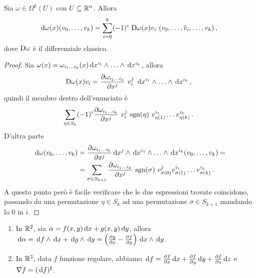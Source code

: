 \begin{corollary}
	Sia $\omega \in \Omega^k(U)$ con $U\subseteq \mathbb R^n$. Allora
	\begin{equation*}
		\,\mathrm d \omega (x) (v_0,\ldots,v_k) = \sum_{i=0}^k (-1)^i\ \mathrm D \omega (x) v_i\ (v_0,\ldots,\hat v_i, \ldots, v_k)\, \text{, }
	\end{equation*}
	dove $\mathrm D \omega$ è il differenziale classico.
\end{corollary}
\begin{proof}
	Sia $\omega(x) = \omega_{i_1 \ldots  i_{k}} (x) \,\mathrm d x^{i_1}\wedge\ldots\wedge \,\mathrm d x^{i_k}$, allora
	\begin{equation*}
		\mathrm D \omega(x) v_i = \frac{\partial \omega_{i_1 \ldots  i_{k}}}{\partial x^j}\ v_i^j\ \,\mathrm d x^{i_1}\wedge\ldots\wedge \,\mathrm d x^{i_k} \, \text{, }
	\end{equation*}
	quindi il membro destro dell'enunciato è
	\begin{equation*}
		\sum_{\eta\in S_k}(-1)^i \DerParz{\omega_{\seqb ik{}}}{x^j}\ v_i^j\ \sgn(\eta)\ v_{\eta(1)}^{i_1} \ldots v_{\eta(k)}^{i_k} \punto
	\end{equation*}
	D'altra parte
	\begin{align*}
		\,\mathrm d \omega (v_0,\ldots,v_k) &= \frac{\partial \omega_{i_1 \ldots  i_{k}}}{\partial x^j} \,\mathrm d x^j \wedge \,\mathrm d x^{i_1}\wedge\ldots\wedge \,\mathrm d x^{i_k} (v_0,\ldots,v_k)= \\ 
		&=\sum_{\sigma \in S_{k+1}}\frac{\partial \omega_{i_1 \ldots  i_{k}}}{\partial x^j}\ \mathrm{sgn}(\sigma)\ v_{\sigma(0)}^{j} v_{\sigma(1)}^{i_1} \ldots v_{\sigma(k)}^{i_k} \, \text{. }
	\end{align*}
	A questo punto però è facile verificare che le due espressioni trovate coincidono, passando da una permutazione $\eta \in S_k$ ad una permutazione $\sigma \in S_{k+1}$ mandando lo 0 in $i$.
\end{proof}

\begin{example}
	\begin{enumerate}
	 \item In $\mathbb R^2$, sia $\alpha = f(x,y) \,\mathrm d x + g(x,y) \,\mathrm d y$, allora $\,\mathrm d \alpha= \,\mathrm d f\wedge \,\mathrm d x + \,\mathrm d g \wedge \,\mathrm d y = \left(\frac{\partial g}{\partial x} - \frac{\partial f}{\partial y}\right) \,\mathrm d x\wedge \,\mathrm d y $.
	 \item In $\mathbb R^3$, data $f$ funzione regolare, abbiamo $\,\mathrm d f = \frac{\partial f}{\partial x} \,\mathrm d x + \frac{\partial f}{\partial y} \,\mathrm d y + \frac{\partial f}{\partial z} \,\mathrm d z$ e $\nabla f = (\,\mathrm d f)^\sharp$.
	\end{enumerate}
\end{example}

